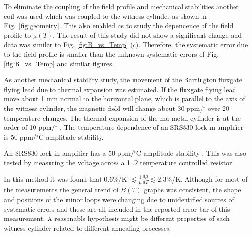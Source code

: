 \documentclass[review]{elsarticle}
\begin{document}
To eliminate the coupling of the field profile and mechanical
stabilities another coil was used which was coupled to the witness
cylinder as shown in Fig.~\ref{fig:geometry}.  This also enabled us to
study the dependence of the field profile to $\mu(T)$. The result of this study did not show a significant change and data was similar to Fig. \ref{fig:B_vs_Temp} (c). Therefore, the systematic error due to the field profile is smaller than the unknown systematic errors of Fig. \ref{fig:B_vs_Temp} and similar figures.

As another mechanical stability study, the movement of the Bartington fluxgate flying lead due to thermal expansion was estimated. If the fluxgate flying lead move about 1 mm normal to the horizontal plane, which is parallel to the axis of the witness cylinder, the magnetic field will change about 30 ppm/$^{\circ}$ over 20 $^{\circ}$ temperature changes.
The thermal expansion of the mu-metal cylinder is at the order of 10 ppm/$^{\circ}$ \cite{kruppvdm}.
The temperature dependence of an SRS830 lock-in amplifier is 50 ppm/$^\circ$C amplitude stability.

An SRS830 lock-in amplifier has a 50 ppm/$^\circ$C amplitude stability \cite{bib:lockin}. This was also tested by measuring the voltage across a 1 $\Omega$ temperature controlled resistor. 










In this method it was found that 0.6\%/K
$\lesssim\frac{1}{\mu}\frac{d\mu}{dT}\lesssim 2.3\%$/K. Although for
most of the measurements the general trend of $B(T)$ graphs was
consistent, the shape and positions of the minor loops were changing
due to unidentified sources of systematic errors and these are all
included in the reported error bar of this measurement. A reasonable
hypothesis might be different properties of each witness cylinder
related to different annealing processes.
\end{document}
